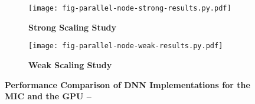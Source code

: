 
\begin{figure}[h]

  \begin{minipage}[t]{0.48\tw}
  \begin{subfigure}{\tw}

  \centering
  \texttt{[image: fig-parallel-node-strong-results.py.pdf]}
  \caption{\textbf{Strong Scaling Study}}
  \label{fig-parallel-node-strong-results}

  \end{subfigure}
  \end{minipage}%
  \hfill%
  \begin{minipage}[t]{0.48\tw}
  \begin{subfigure}{\tw}

  \centering
  \texttt{[image: fig-parallel-node-weak-results.py.pdf]}
  \caption{\textbf{Weak Scaling Study}}
  \label{fig-parallel-node-weak-results}

  \end{subfigure}
  \end{minipage}%

  \caption{\textbf{Performance Comparison of DNN Implementations for the
      MIC and the GPU --} }

  \label{fig-evaluation-results}

\end{figure}
